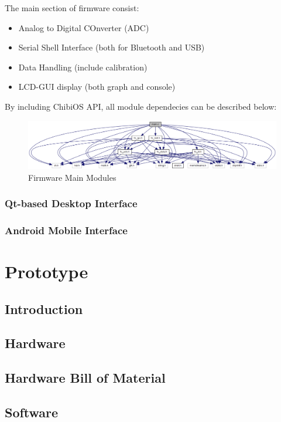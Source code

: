 \documentclass[12pt,]{book}
\begin{document}
	The main section of firmware consist:
	\begin{itemize}
		\item Analog to Digital COnverter (ADC)
		\item Serial Shell Interface (both for Bluetooth and USB)
		\item Data Handling (include calibration)
		\item LCD-GUI display (both graph and console)		
	\end{itemize}

	By including ChibiOS API, all module dependecies can be described below:
	\begin{figure}[h]
		\centering
		\includegraphics[width=\linewidth]{images/jw_ch_main}
		\caption{Firmware Main Modules}
	\end{figure}
		
	\subsection{Qt-based Desktop Interface}
	
	\subsection{Android Mobile Interface}
	
	\newpage
	\chapter{Prototype}
	
	\section{Introduction}
	
	\section{Hardware}
	
	\section{Hardware Bill of Material}
		
	\section{Software}
	
\end{document}

